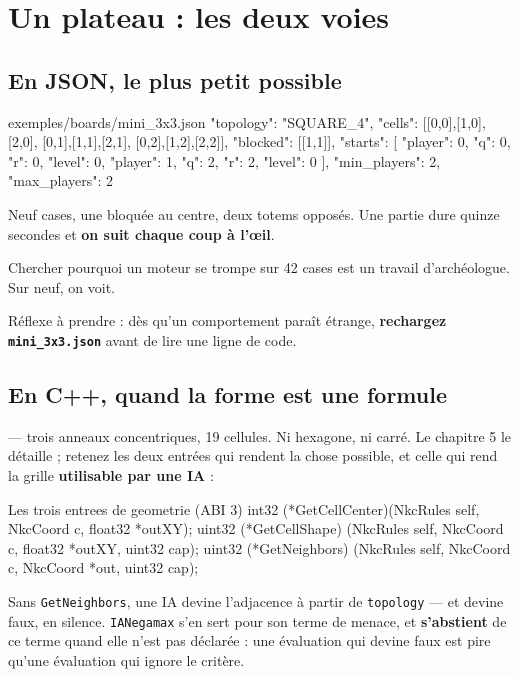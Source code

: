 \section{Un plateau : les deux voies}

\subsection{En JSON, le plus petit possible}

\begin{nkcode}{exemples/boards/mini\_3x3.json}
{
  "topology": "SQUARE_4",
  "cells": [[0,0],[1,0],[2,0],
            [0,1],[1,1],[2,1],
            [0,2],[1,2],[2,2]],
  "blocked": [[1,1]],
  "starts": [
    {"player": 0, "q": 0, "r": 0, "level": 0},
    {"player": 1, "q": 2, "r": 2, "level": 0}
  ],
  "min_players": 2, "max_players": 2
}
\end{nkcode}

Neuf cases, une bloquée au centre, deux totems opposés. Une partie dure quinze
secondes et \textbf{on suit chaque coup à l'œil}.

\begin{nkretenir}
Chercher pourquoi un moteur se trompe sur 42 cases est un travail d'archéologue.
Sur neuf, on voit.

Réflexe à prendre : dès qu'un comportement paraît étrange, \textbf{rechargez
\texttt{mini\_3x3.json}} avant de lire une ligne de code.
\end{nkretenir}

\subsection{En C++, quand la forme est une formule}

 — trois anneaux concentriques, 19
cellules. Ni hexagone, ni carré. Le chapitre 5 le détaille ; retenez les deux
entrées qui rendent la chose possible, et celle qui rend la grille
\textbf{utilisable par une IA} :

\begin{nkcode}{Les trois entrees de geometrie (ABI 3)}
int32  (*GetCellCenter)(NkcRules self, NkcCoord c, float32 *outXY);
uint32 (*GetCellShape) (NkcRules self, NkcCoord c, float32 *outXY, uint32 cap);
uint32 (*GetNeighbors) (NkcRules self, NkcCoord c, NkcCoord *out, uint32 cap);
\end{nkcode}

Sans \texttt{GetNeighbors}, une IA devine l'adjacence à partir de
\texttt{topology} — et devine faux, en silence. \texttt{IANegamax} s'en sert pour
son terme de menace, et \textbf{s'abstient} de ce terme quand elle n'est pas
déclarée : une évaluation qui devine faux est pire qu'une évaluation qui ignore
le critère.


